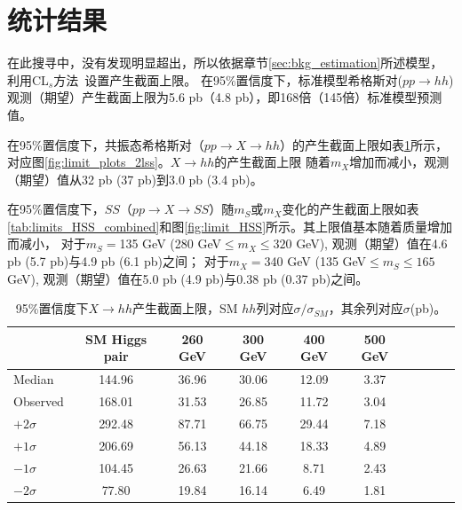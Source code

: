 \section{统计结果}\label{sec:statistics}
在此搜寻中，没有发现明显超出，所以依据章节\ref{sec:bkg_estimation}所述模型，利用CL$_s$方法~\cite{Read:2002hq}设置产生截面上限。
  在95\%置信度下，标准模型希格斯对($pp\rightarrow hh$)观测（期望）产生截面上限为5.6 pb（4.8 pb），即168倍（145倍）标准模型预测值。

  在95\%置信度下，共振态希格斯对（$pp\rightarrow X \rightarrow hh$）的产生截面上限如表\ref{tab:upper_limits_2lss}所示，对应图\ref{fig:limit_plots_2lss}。$X\rightarrow hh$的产生截面上限
  随着$m_X$增加而减小，观测（期望）值从32 pb (37 pb)到3.0 pb (3.4 pb)。

  在95\%置信度下，$SS$（$pp\rightarrow X\rightarrow SS$）随$m_S$或$m_X$变化的产生截面上限如表\ref{tab:limits_HSS_combined}和图\ref{fig:limit_HSS}所示。其上限值基本随着质量增加而减小，
  对于$m_S=$135 GeV (280 GeV$\leq m_X \leq 320$ GeV), 观测（期望）值在4.6 pb (5.7 pb)与4.9 pb (6.1 pb)之间；
 对于$m_X=$340 GeV (135 GeV$\leq m_S \leq 165$ GeV), 观测（期望）值在5.0 pb (4.9 pb)与0.38 pb (0.37 pb)之间。  

\begin{table}[!ht]
\scriptsize
\begin{center}
\begin{tabular}{l|c|cccccccc}
\hline
\hline
             & SM Higgs pair & 260 GeV  & 300 GeV & 400 GeV &500 GeV   \\
\hline
Median &144.96 &36.96 &30.06 &12.09 &3.37 \\
Observed    &168.01 &31.53 &26.85 &11.72 &3.04 \\
\hline
$+2\sigma$ &292.48 &87.71 &66.75 &29.44 &7.18 \\
$+1\sigma$ &206.69 &56.13 &44.18 &18.33 &4.89 \\
$-1\sigma$ &104.45 &26.63 &21.66 &8.71 &2.43 \\
$-2\sigma$ &77.80 &19.84 &16.14 &6.49 &1.81 \\
\hline
\hline
\end{tabular}
\caption{95\%置信度下$X\rightarrow hh$产生截面上限，SM $hh$列对应$\sigma/\sigma_{SM}$，其余列对应$\sigma$(pb)。}
\label{tab:upper_limits_2lss}
\end{center}
\end{table}

